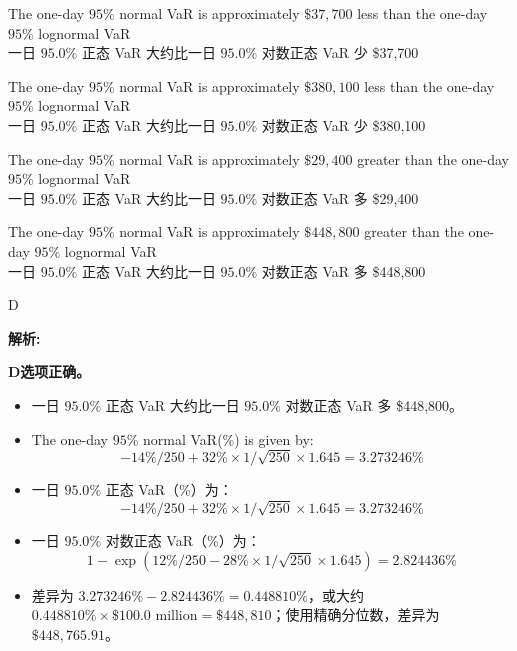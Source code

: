\documentclass{article}
\newenvironment{explanation}
{\textbf{解析:}\par}
{\par}
\begin{document}
\begin{choices}
    \item The one-day $95\%$ normal VaR is approximately $\$37,700$ less than the one-day $95\%$ lognormal VaR\\
    一日 $95.0\%$ 正态 VaR 大约比一日 $95.0\%$ 对数正态 VaR 少 \$37,700
    \item The one-day $95\%$ normal VaR is approximately $\$380,100$ less than the one-day $95\%$ lognormal VaR\\
    一日 $95.0\%$ 正态 VaR 大约比一日 $95.0\%$ 对数正态 VaR 少 \$380,100
    \item The one-day $95\%$ normal VaR is approximately $\$29,400$ greater than the one-day $95\%$ lognormal VaR\\
    一日 $95.0\%$ 正态 VaR 大约比一日 $95.0\%$ 对数正态 VaR 多 \$29,400
    \item The one-day $95\%$ normal VaR is approximately $\$448,800$ greater than the one-day $95\%$ lognormal VaR\\
    一日 $95.0\%$ 正态 VaR 大约比一日 $95.0\%$ 对数正态 VaR 多 \$448,800
\end{choices}

\begin{correctanswer}
D
\end{correctanswer}

\begin{explanation}
    \textbf{D选项正确。}
    \begin{itemize}
        \item 一日 $95.0\%$ 正态 VaR 大约比一日 $95.0\%$ 对数正态 VaR 多 \$448,800。
    \end{itemize}
    
    \begin{itemize}
        \item The one-day $95\%$ normal VaR(\%) is given by:
        $$-14\%/250 + 32\% \times 1/\sqrt{250} \times 1.645 = 3.273246\%$$
        \item 一日 $95.0\%$ 正态 VaR（\%）为：
        $$-14\%/250 + 32\% \times 1/\sqrt{250} \times 1.645 = 3.273246\%$$
        \item 一日 $95.0\%$ 对数正态 VaR（\%）为：
        $$1 - \exp(12\%/250 - 28\% \times 1/\sqrt{250} \times 1.645) = 2.824436\%$$
        \item 差异为 $3.273246\% - 2.824436\% = 0.448810\%$，或大约 $0.448810\% \times \$100.0 \text{ million} = \$448,810$；使用精确分位数，差异为 $\$448,765.91$。
    \end{itemize}
\end{explanation}
\end{document}
